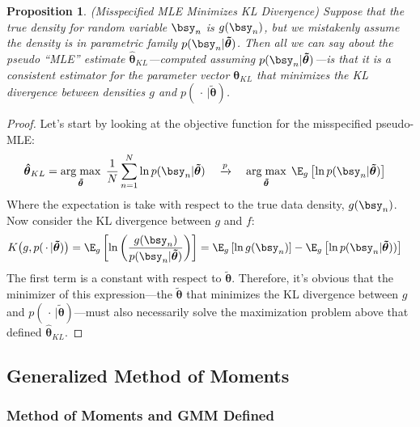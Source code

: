 \documentclass[12pt]{article}
\theoremstyle{plain}
\newtheorem{prop}[thm]{Proposition}
\theoremstyle{definition}
\theoremstyle{remark}
\newcommand{\bstheta}{\boldsymbol{\theta}}
\newcommand{\bshattheta}{\boldsymbol{\hat{\theta}}}
\newcommand{\bstildetheta}{\boldsymbol{\tilde{\theta}}}
\DeclareMathOperator*{\argmax}{arg\;max}
\newcommand{\pto}{\xrightarrow{p}}
\newcommand{\sumnN}{\sum^N_{n=1}}
\begin{document}
\begin{prop}\emph{(Misspecified MLE Minimizes KL Divergence)}
Suppose that the true density for random variable $\bsy_n$ is
$g(\bsy_n)$, but we mistakenly assume the density is in parametric
family $p(\bsy_n|\bstildetheta)$. Then all we can say about the pseudo
``MLE'' estimate $\bshattheta_{KL}$---computed assuming
$p(\bsy_n|\bstildetheta)$---is that it is a consistent estimator for the
parameter vector $\bstheta_{KL}$ that minimizes the KL divergence
between densities $g$ and $p(\,\cdot\,|\bstildetheta)$.
\end{prop}
\begin{proof}
Let's start by looking at the objective function for the misspecified
pseudo-MLE:
\begin{align*}
  \bshattheta_{KL}
  &=
  \argmax_{\bstildetheta}\;
  \frac{1}{N} \sumnN
  \ln p(\bsy_n|\bstildetheta)
  \quad
  \pto\quad
  \argmax_{\bstildetheta}\;
  \E_g\left[
  \ln p(\bsy_n|\bstildetheta)
  \right]
\end{align*}
Where the expectation is take with respect to the true data density,
$g(\bsy_n)$. Now consider the KL divergence between $g$ and $f$:
\begin{align*}
  K\big(g,p(\,\cdot\,|\bstildetheta)\big)
  &= \E_g\left[
  \ln\left(\frac{g(\bsy_n)}{p(\bsy_n|\bstildetheta)}\right)
  \right]
  =
  \E_g\left[
  \ln g(\bsy_n)
  \right]
  -
  \E_g\left[
  \ln p(\bsy_n|\bstildetheta))
  \right]
\end{align*}
The first term is a constant with respect to $\bstildetheta$. Therefore,
it's obvious that the minimizer of this expression---the $\bstildetheta$
that minimizes the KL divergence between $g$ and
$p(\,\cdot\,|\bstildetheta)$---must also necessarily solve the
maximization problem above that defined $\bshattheta_{KL}$.
\end{proof}


\clearpage
\subsection{Generalized Method of Moments}

\subsubsection{Method of Moments and GMM Defined}
\end{document}
